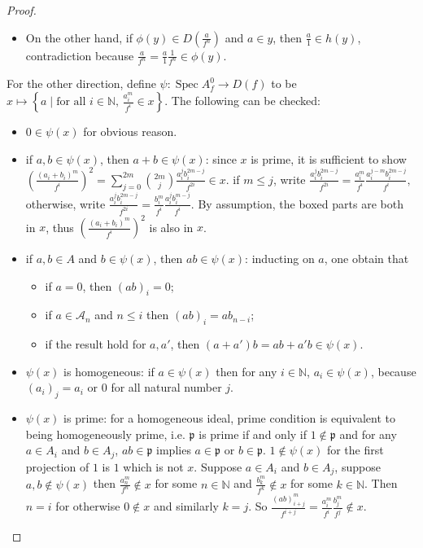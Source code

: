 \documentclass[a4paper,UKenglish,cleveref, autoref, thm-restate]{lipics-v2021}
\begin{document}
\begin{proof}
\begin{itemize}
\begin{itemize}
            \item On the other hand, if $\phi(y)\in D\left(\frac a{f^n}\right)$ and $a\in y$, then $\frac a 1\in h(y)$, contradiction because $\frac a{f^n}=\frac a1\frac1{f^n}\in \phi(y)$.
        \end{itemize}
    \end{itemize}
    For the other direction, define $\psi: \operatorname{Spec} A^0_f\to{D(f)}$ to be $x \mapsto \left\{a\mid\text{for all $i\in\mathbb N$, $\frac{a_i^m}{f^i}\in x$}\right\}$. The following can be checked:
    \begin{itemize}
        \item $0\in \psi(x)$ for obvious reason.
        \item if $a,b\in \psi(x)$, then $a + b\in \psi(x)$: since $x$ is prime, it is sufficient to show
            $\left(\frac{(a_i+b_i)^m}{f^i}\right)^2 = \sum_{j=0}^{2m}{2m\choose j}\frac{a_i^j b_i^{2m-j}}{f^{2i}}\in x$.
        if $m\le j$, write
        $
        \frac{a_i^j b_i^{2m-j}}{f^{2i}} = \boxed{\frac{a_i^m}{f^i}}\frac{a_i^{j-m}b_i^{2m-j}}{f^i},
        $
        otherwise, write
        $
        \frac{a_i^j b_i^{2m-j}}{f^{2i}} =\boxed{\frac{b_i^m}{f^i}}\frac{a_i^jb_i^{m-j}}{f^i}.
        $
        By assumption, the boxed parts are both in $x$, thus $\left(\frac{(a_i+b_i)^m}{f^i}\right)^2$ is also in $x$.
        \item if $a, b \in A$ and $b\in \psi(x)$, then $ab\in \psi(x)$: inducting on $a$, one obtain that
        \begin{itemize}
            \item if $a = 0$, then $(ab)_i=0$;
            \item if $a\in \mathcal{A}_n$ and $n\le i$ then $(ab)_i=ab_{n-i}$;
            \item if the result hold for $a, a'$, then $(a+a')b=ab+a'b\in \psi(x)$.
        \end{itemize}
        \item $\psi(x)$ is homogeneous: if $a\in \psi(x)$ then for any $i\in\mathbb N$, $a_i\in \psi(x)$, because $\left(a_i\right)_j=a_i$ or $0$ for all natural number $j$.
        \item $\psi(x)$ is prime: for a homogeneous ideal, prime condition is equivalent to being homogeneously prime, i.e. $\mathfrak p$ is prime if and only if $1\not\in\mathfrak p$ and for any $a\in A_i$ and $b\in A_j$, $ab\in\mathfrak p$ implies $a\in\mathfrak p$ or $b\in\mathfrak p$.  $1\not\in\psi(x)$ for the first projection of $1$ is $1$ which is not $x$. Suppose $a\in A_i$ and $b\in A_j$, suppose $a,b\not\in \psi(x)$ then $\frac{a_n^m}{f^n}\not\in x$ for some $n\in\mathbb N$ and $\frac{b_k^m}{f^k}\not\in x$ for some $k\in\mathbb N$. Then $n=i$ for otherwise $0\not\in x$ and similarly $k=j$. So $\frac{(ab)_{i+j}^m}{f^{i+j}}=\frac{a_i^m}{f^i}\frac{b_j^m}{f^j}\not\in x$.

\end{itemize}
\end{proof}
\end{document}
